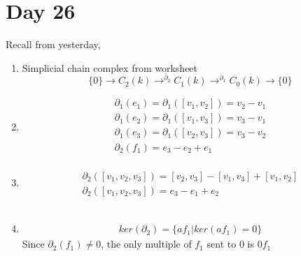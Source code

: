 \documentclass[../notes.tex]{subfiles}
\begin{document}
\section{Day 26}
Recall from yesterday,
\begin{enumerate}
    \item Simplicial chain complex from worksheet
        \[
            \{0\}\rightarrow C_2(k)
            \rightarrow^{\partial_2}C_1(k)
            \rightarrow^{\partial_1}C_0(k)
            \rightarrow \{0\}
        \]
    \item 
        \begin{align*}
            \partial_1(e_1) = \partial_1([v_1,v_2]) = v_2-v_1\\
            \partial_1(e_2) = \partial_1([v_1,v_3]) = v_3-v_1\\
            \partial_1(e_3) = \partial_1([v_2,v_3]) = v_3-v_2\\
            \partial_2(f_1) = e_3 - e_2 + e_1\\
        \end{align*}
    \item 
        \begin{align*}
            \partial_2([v_1,v_2,v_3])=[v_2,v_3]-[v_1,v_3]+[v_1,v_2]\\
            \partial_2([v_1,v_2,v_3])=e_3-e_1+e_2
        \end{align*}\\
        \begin{center}
        \end{center}
    \item 
        \begin{align*}
            ker(\partial_2)=\{af_1| ker(af_1)=0\}
        \end{align*}
        Since $\partial_2(f_1)\neq 0$, the only multiple of $f_1$ sent to 0 is $0f_1$

\end{enumerate}
\end{document}
